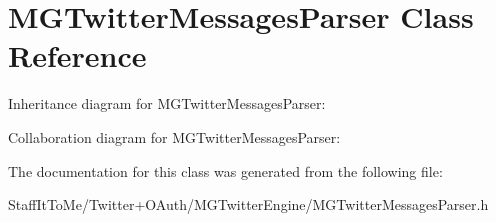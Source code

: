 \hypertarget{interface_m_g_twitter_messages_parser}{
\section{\-M\-G\-Twitter\-Messages\-Parser \-Class \-Reference}
\label{interface_m_g_twitter_messages_parser}
}


\-Inheritance diagram for \-M\-G\-Twitter\-Messages\-Parser\-:


\-Collaboration diagram for \-M\-G\-Twitter\-Messages\-Parser\-:


\-The documentation for this class was generated from the following file\-:\begin{DoxyCompactItemize}
\item 
\-Staff\-It\-To\-Me/\-Twitter+\-O\-Auth/\-M\-G\-Twitter\-Engine/\-M\-G\-Twitter\-Messages\-Parser.\-h\end{DoxyCompactItemize}
